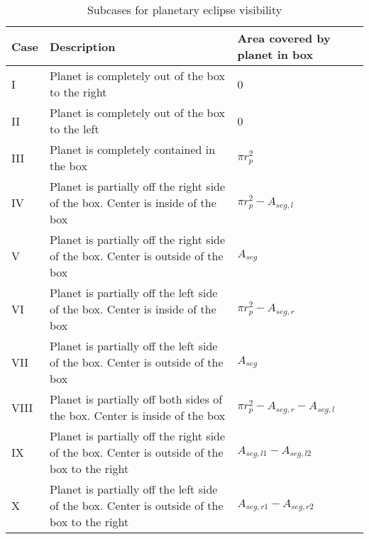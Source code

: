 \documentclass[iop]{emulateapj}
\begin{document}
\begin{table}
	\caption{Subcases for planetary eclipse visibility}
	\label{cases}
	\begin{center}
	\renewcommand{\arraystretch}{1.2}
		\begin{tabular}{| m{} | m{} | m{} |} %
			\hline
			\textbf{Case}    & \textbf{Description} & \textbf{Area covered by planet in box}\\ %
			\hline%
			I      &   Planet is completely out of the box to the right                                                                      & 0                                                           \\ \hline
			II     &   Planet is completely out of the box to the left                                                                         & 0                                                           \\ \hline
			III    &   Planet is completely contained in the box                                                                              & $\pi r_p^2$                                         \\ \hline
			IV    &   Planet is partially off the right side of the box. Center is inside of the box                       & $\pi r_p^2 - A_{seg,l}$                     \\ \hline
			V     &   Planet is partially off the right side of the box. Center is outside of the box                     & $A_{seg}$                                          \\ \hline
			VI    &   Planet is partially off the left side of the box. Center is inside of the box                          & $\pi r_p^2 - A_{seg,r}$                     \\ \hline
			VII   &   Planet is partially off the left side of the box. Center is outside of the box                        & $A_{seg}$                                          \\ \hline
			VIII  &   Planet is partially off both sides of the box. Center is inside of the box                            & $\pi r_p^2 - A_{seg,r} - A_{seg,l}$ \\ \hline
			IX    &   Planet is partially off the right side of the box. Center is outside of the box to the right & $A_{seg,l1} - A_{seg,l2}$                \\ \hline
			X     &   Planet is partially off the left side of the box. Center is outside of the box to the right    & $A_{seg,r1} - A_{seg,r2}$               \\ \hline
		\end{tabular}
	\end{center}
\end{table}
\end{document}
